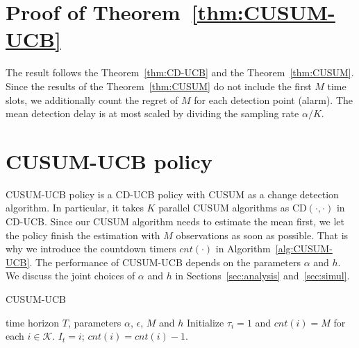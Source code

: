 \documentclass[letterpaper]{article} %
\newcommand{\blue}{}
\begin{document}
\section{Proof of Theorem~\ref{thm:CUSUM-UCB}}
The result follows the Theorem~\ref{thm:CD-UCB} and the
Theorem~\ref{thm:CUSUM}. Since the results of the
Theorem~\ref{thm:CUSUM} do not include the first $M$ time slots, we
additionally count the regret of $M$ for each detection point (alarm). The mean detection delay is at most scaled by dividing the sampling rate $\alpha/K$. 

\section{CUSUM-UCB policy}\label{app:cusumucb}
CUSUM-UCB policy is a CD-UCB policy with CUSUM as a change detection algorithm. In particular, it takes $K$ parallel CUSUM algorithms as CD$(\cdot,\cdot)$ in CD-UCB. Since our CUSUM algorithm needs to estimate the mean first, we let the policy finish the estimation with $M$ observations as soon as possible. That is why we introduce the countdown timers $cnt(\cdot)$ in Algorithm~\ref{alg:CUSUM-UCB}. The performance of CUSUM-UCB depends on the parameters $\alpha$ and $h$. We discuss the joint choices of $\alpha$ and $h$ in Sections~\ref{sec:analysis} and~\ref{sec:simul}.
\begin{algorithm}[tb]
\caption{CUSUM-UCB}
\label{alg:CUSUM-UCB}
\begin{algorithmic}
\REQUIRE time horizon $T$, parameters $\alpha$, $\epsilon$, $M$ and $h$
\STATE Initialize $\tau_i=1$ and $cnt(i)=M$ for each $i\in\mathcal{K}$.
\STATE $I_t=i$; $cnt(i)=cnt(i)-1.$
\ELSE
{}
\ENDIF
\STATE{{\blue Play arm $I_t$ and observe $X_t(I_t)$.}}
\ENDIF
\ENDFOR
\end{algorithmic}
\end{algorithm}
\end{document}
